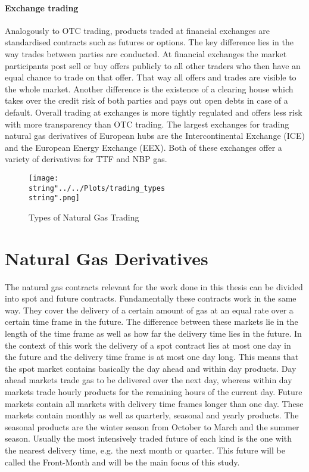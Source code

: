 \paragraph{Exchange trading}
Analogously to OTC trading, products traded at financial exchanges are standardised contracts such as futures or options. The key difference lies in the way trades between parties are conducted. At financial exchanges the market participants post sell or buy offers publicly to all other traders who then have an equal chance to trade on that offer. That way all offers and trades are visible to the whole market. Another difference is the existence of a clearing house which takes over the credit risk of both parties and pays out open debts in case of a default. Overall trading at exchanges is more tightly regulated and offers less risk with more transparency than OTC trading. The largest exchanges for trading natural gas derivatives of European hubs are the Intercontinental Exchange (ICE) and the European Energy Exchange (EEX). Both of these exchanges offer a variety of derivatives for TTF and NBP gas.

\begin{figure}[H]
  \centering
\texttt{[image: \\string"../../Plots/trading\_types\\string".png]}
  \caption{Types of Natural Gas Trading}\label{fig:trading_types}
\end{figure}

\section{Natural Gas Derivatives}
The natural gas contracts relevant for the work done in this thesis can be divided into spot and future contracts. Fundamentally these contracts work in the same way. They cover the delivery of a certain amount of gas at an equal rate over a certain time frame in the future. The difference between these markets lie in the length of the time frame as well as how far the delivery time lies in the future. In the context of this work the delivery of a spot contract lies at most one day in the future and the delivery time frame is at most one day long. This means that the spot market contains basically the day ahead and within day products. Day ahead markets trade gas to be delivered over the next day, whereas within day markets trade hourly products for the remaining hours of the current day. Future markets contain all markets with delivery time frames longer than one day. These markets contain monthly as well as quarterly, seasonal and yearly products. The seasonal products are the winter season from October to March and the summer season. Usually the most intensively traded future of each kind is the one with the nearest delivery time, e.g. the next month or quarter. This future will be called the Front-Month and will be the main focus of this study. 

